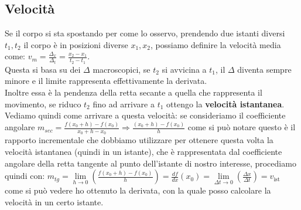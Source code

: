 \documentclass[a4paper,12pt]{report}
\begin{document}
	\subsection{Velocità}
	Se il corpo si sta spostando per come lo osservo, prendendo due istanti diversi ${t_1,t_2}$ il corpo è in posizioni diverse ${x_1,x_2}$, possiamo definire la velocità media come: ${v_m = \frac{\Delta_x}{\Delta_t} = \frac{x_2 - x_1}{t_2 - t_1}}$.\\
	Questa si basa su dei ${\Delta}$ macroscopici, se ${t_2}$ si avvicina a ${t_1}$, il ${\Delta}$ diventa sempre minore e il limite rappresenta effettivamente la derivata.\\
	Inoltre essa è la pendenza della retta secante a quella che rappresenta il movimento, se riduco $t_2$ fino ad arrivare a $t_1$ ottengo la \textbf{velocità istantanea}.\\
	Vediamo quindi come arrivare a questa velocità: se consideriamo il coefficiente angolare $m_{sec} = {{\frac{f(x_0 + h) - f(x_0)}{x_0 + h - x_0}} \Rightarrow {\frac{(x_0 + h) - f(x_0)}{h}}}$ come si può notare questo è il rapporto incrementale che dobbiamo utilizzare per ottenere questa volta la velocità istantanea (quindi in un istante), che è rappresentata dal coefficiente angolare della retta tangente al punto dell'istante di nostro interesse, procediamo quindi con: $m_{tg} = {\lim\limits_{h\to0}(\frac{f(x_0 + h) - f(x_0)}{h})} = {\frac{df}{dx}(x_0)} = {\lim\limits_{\Delta t\to0}(\frac{\Delta x}{\Delta t})} = v_{\text{ist}}$ come si può vedere ho ottenuto la derivata, con la quale posso calcolare la velocità in un certo istante.
\end{document}
